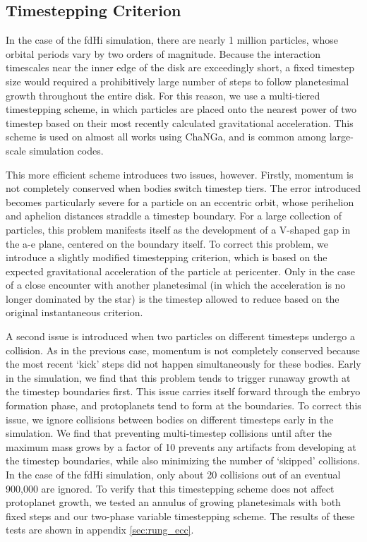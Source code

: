 \subsection{Timestepping Criterion}\label{sec:timestep}

In the case of the fdHi simulation, there are nearly 1 million
particles, whose orbital periods vary by two orders of magnitude. Because the
interaction timescales near the inner edge of the
disk are exceedingly short, a fixed timestep size would required a prohibitively large
number of steps to follow planetesimal growth throughout the entire
disk. For this reason, we use a multi-tiered timestepping scheme, in
which particles are placed onto the nearest power of two timestep
based on their most recently calculated gravitational
acceleration. This scheme is used on almost all works using ChaNGa,
and is common among large-scale simulation codes.

This more efficient scheme introduces two issues, however. Firstly,
momentum is not completely conserved when bodies switch timestep tiers. The
error introduced becomes particularly severe for a particle on an
eccentric orbit, whose perihelion and aphelion distances
straddle a timestep boundary. For a large collection of particles,
this problem manifests itself as the development of a V-shaped gap in the a-e plane, centered on the boundary itself. To correct this problem, we introduce a slightly modified timestepping criterion, which is based on the expected gravitational acceleration of the particle at pericenter. Only in the case of a close encounter with another planetesimal (in which the acceleration is no longer dominated by the star) is the timestep allowed to reduce based on the original instantaneous criterion.

A second issue is introduced when two particles on different timesteps
undergo a collision. As in the previous case, momentum is not
completely conserved because the most recent `kick' steps did not
happen simultaneously for these bodies. Early in the simulation, we
find that this problem tends to trigger runaway growth at the timestep
boundaries first. This issue carries itself forward through the embryo
formation phase, and protoplanets tend to form at the boundaries. To
correct this issue, we ignore collisions between bodies on different
timesteps early in the simulation. We find that preventing
multi-timestep collisions until after the maximum mass grows by a
factor of 10 prevents any artifacts from developing at the timestep
boundaries, while also minimizing the number of `skipped' collisions. In the case of the fdHi simulation, only about 20 collisions out of an eventual 900,000 are ignored. To verify that this timestepping scheme does not affect protoplanet growth, we tested an annulus of growing planetesimals with both fixed steps and our two-phase variable timestepping scheme. The results of these tests are shown in appendix \ref{sec:rung_ecc}.

